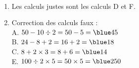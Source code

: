    \ \\ [-5mm]
   \begin{enumerate}
      \item Les calculs justes sont les calculs {\blue D} et {\blue F}.
      \item Correction des calculs faux : \\
         A. $50-10\div2 =50-5 ={\blue 45}$ \\
         B. $24-8+2 =16+2 ={\blue 18}$ \\
         C. $8+2\times3 =8+6 ={\blue 14}$ \\
         E. $100\div2\times5 =50\times5 = {\blue 250}$
   \end{enumerate}
